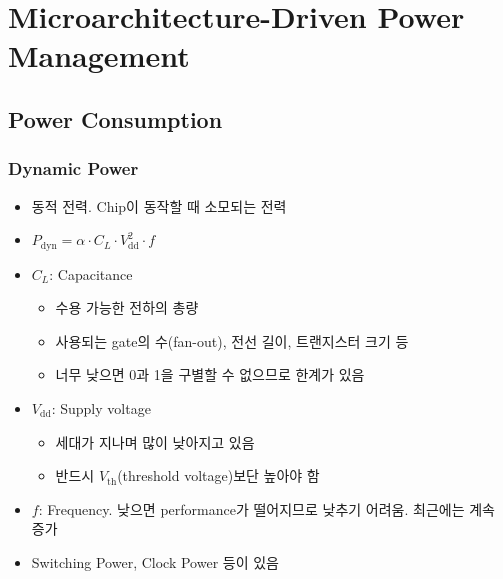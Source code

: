 \section{Microarchitecture-Driven Power Management}

\subsection{Power Consumption}

\subsubsection*{Dynamic Power}
\begin{itemize}
    \item 동적 전력. Chip이 동작할 때 소모되는 전력
    \item $P_{\mathrm{dyn}} = \alpha \cdot C_L \cdot V_{\mathrm{dd}}^2 \cdot f$
    \item $C_L$: Capacitance
    \begin{itemize}
        \item 수용 가능한 전하의 총량
        \item 사용되는 gate의 수(fan-out), 전선 길이, 트랜지스터 크기 등
        \item 너무 낮으면 0과 1을 구별할 수 없으므로 한계가 있음
    \end{itemize}
    \item $V_{\mathrm{dd}}$: Supply voltage
    \begin{itemize}
        \item 세대가 지나며 많이 낮아지고 있음
        \item 반드시 $V_{\mathrm{th}}$(threshold voltage)보단 높아야 함
    \end{itemize}
    \item $f$: Frequency. 낮으면 performance가 떨어지므로 낮추기 어려움. 최근에는 계속 증가
    \item Switching Power, Clock Power 등이 있음
\end{itemize}

